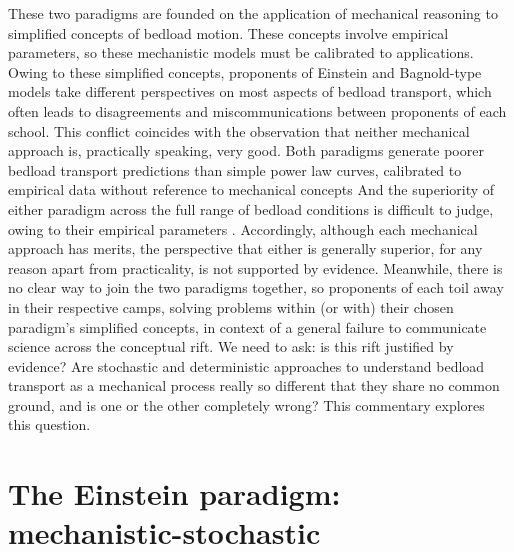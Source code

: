 \documentclass{article}
\begin{document}
These two paradigms are founded on the application of mechanical reasoning to simplified concepts of bedload motion.
These concepts involve empirical parameters, so these mechanistic models must be calibrated to applications. 
Owing to these simplified concepts, proponents of Einstein and Bagnold-type models take different perspectives on most aspects of bedload transport, which often leads to disagreements and miscommunications between proponents of each school. 
This conflict coincides with the observation that neither mechanical approach is, practically speaking, very good.
Both paradigms generate poorer bedload transport predictions than simple power law curves, calibrated to empirical data without reference to mechanical concepts \citep{Barry2004}
And the superiority of either paradigm across the full range of bedload conditions is difficult to judge, owing to their empirical parameters \citep{Iverson2013}. 
Accordingly, although each mechanical approach has merits, the perspective that either is generally superior, for any reason apart from practicality, is not supported by evidence. 
Meanwhile, there is no clear way to join the two paradigms together, so proponents of each toil away in their respective camps, solving problems within (or with) their chosen paradigm's simplified concepts, in context of a general failure to communicate science across the conceptual rift. 
We need to ask: is this rift justified by evidence? 
Are stochastic and deterministic approaches to understand bedload transport as a mechanical process really so different that they share no common ground, and is one or the other completely wrong? 
This commentary explores this question. 


\section{The Einstein paradigm: mechanistic-stochastic}

\end{document}
